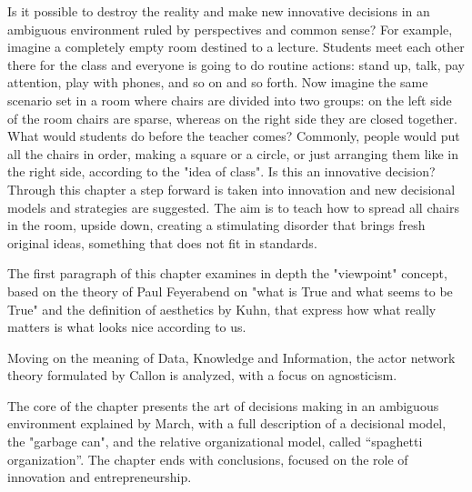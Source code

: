 Is it possible to destroy the reality and make new innovative decisions in an ambiguous environment ruled by perspectives and common sense? For example, imagine a completely empty room destined to a lecture. Students meet each other there for the class and everyone is going to do routine actions: stand up, talk, pay attention, play with phones, and so on and so forth. Now imagine the same scenario set in a room where chairs are divided into two groups: on the left side of the room chairs are sparse, whereas on the right side they are closed together. What would students do before the teacher comes? Commonly, people would put all the chairs in order, making a square or a circle, or just arranging them like in the right side, according to the "idea of class". Is this an innovative decision? Through this chapter a step forward is taken into innovation and new decisional models and strategies are suggested. The aim is to teach how to spread all chairs in the room, upside down, creating a stimulating disorder that brings fresh original ideas, something that does not fit in standards.

The first paragraph of this chapter examines in depth the "viewpoint" concept, based on the theory of Paul Feyerabend on "what is True and what seems to be True" and the definition of aesthetics by Kuhn, that express how what really matters is what looks nice according to us.

Moving on the meaning of Data, Knowledge and Information, the actor network theory formulated by Callon is analyzed, with a focus on agnosticism.

The core of the chapter presents the art of decisions making in an ambiguous environment explained by March, with a full description of a decisional model, the "garbage can", and the relative organizational model, called “spaghetti organization”. The chapter ends with conclusions, focused on the role of innovation and entrepreneurship.

